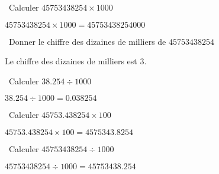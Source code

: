 \begin{questions}
	\question[1]  Calculer $\num{45753438254} \times 1000$
	
	\begin{solution}
		$\num{45753438254} \times 1000 = \num{45753438254000}$
	\end{solution}
	
	\question[1]  Donner le chiffre des dizaines de milliers de $\num{45753438254}$
	
	\begin{solution}
		Le chiffre des dizaines de milliers est 3.
	\end{solution}
	
	
	
	
	
	\question[1]  Calculer $\num{38.254} \div 1000$
	
	\begin{solution}
		$\num{38.254} \div 1000 = \num{0.038254}$
	\end{solution}
	
	
	\question[1]  Calculer $\num{45753.438254} \times 100$
	
	\begin{solution}
		$\num{45753.438254} \times 100 = \num{4575343.8254}$
	\end{solution}
	
	\question[1]  Calculer $\num{45753438254} \div 1000$
	
	\begin{solution}
		$\num{45753438254} \div 1000 = \num{45753438.254}$
	\end{solution}
\end{questions}


